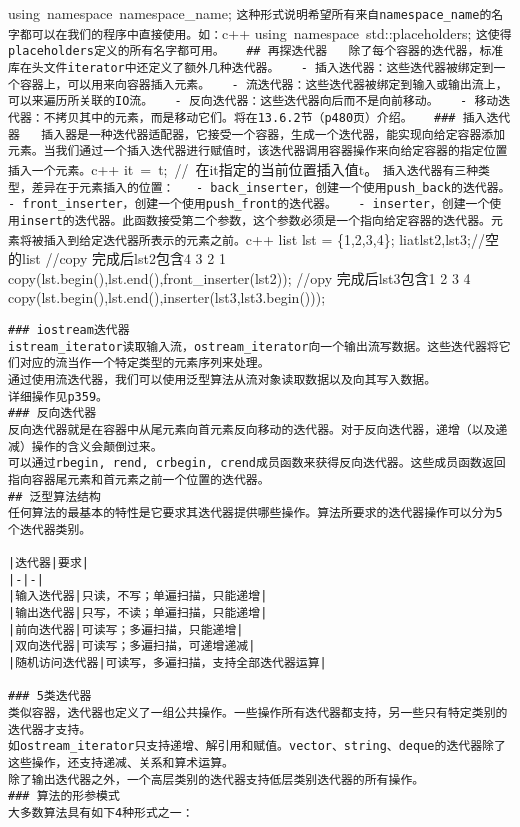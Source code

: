 \documentclass[
  a4paper,
  oneside,tablecaptionabove
]{scrbook}
\begin{document}
using~namespace~namespace\_name;
\lstinline!这种形式说明希望所有来自namespace_name的名字都可以在我们的程序中直接使用。如：!c++
using~namespace~std::placeholders;
\lstinline!这使得placeholders定义的所有名字都可用。   ## 再探迭代器   除了每个容器的迭代器，标准库在头文件iterator中还定义了额外几种迭代器。   - 插入迭代器：这些迭代器被绑定到一个容器上，可以用来向容器插入元素。   - 流迭代器：这些迭代器被绑定到输入或输出流上，可以来遍历所关联的IO流。   - 反向迭代器：这些迭代器向后而不是向前移动。   - 移动迭代器：不拷贝其中的元素，而是移动它们。将在13.6.2节（p480页）介绍。   ### 插入迭代器   插入器是一种迭代器适配器，它接受一个容器，生成一个迭代器，能实现向给定容器添加元素。当我们通过一个插入迭代器进行赋值时，该迭代器调用容器操作来向给定容器的指定位置插入一个元素。!c++
it~=~t;~//~在it指定的当前位置插入值t。
\lstinline!插入迭代器有三种类型，差异在于元素插入的位置：   - back_inserter，创建一个使用push_back的迭代器。   - front_inserter，创建一个使用push_front的迭代器。   - inserter，创建一个使用insert的迭代器。此函数接受第二个参数，这个参数必须是一个指向给定容器的迭代器。元素将被插入到给定迭代器所表示的元素之前。!c++
list lst = \{1,2,3,4\}; liatlst2,lst3;//空的list //copy 完成后lst2包含4
3 2 1 copy(lst.begin(),lst.end(),front\_inserter(lst2)); //opy
完成后lst3包含1 2 3 4
copy(lst.begin(),lst.end(),inserter(lst3,lst3.begin()));

\begin{lstlisting}
### iostream迭代器  
istream_iterator读取输入流，ostream_iterator向一个输出流写数据。这些迭代器将它们对应的流当作一个特定类型的元素序列来处理。  
通过使用流迭代器，我们可以使用泛型算法从流对象读取数据以及向其写入数据。  
详细操作见p359。  
### 反向迭代器  
反向迭代器就是在容器中从尾元素向首元素反向移动的迭代器。对于反向迭代器，递增（以及递减）操作的含义会颠倒过来。  
可以通过rbegin, rend, crbegin, crend成员函数来获得反向迭代器。这些成员函数返回指向容器尾元素和首元素之前一个位置的迭代器。  
## 泛型算法结构  
任何算法的最基本的特性是它要求其迭代器提供哪些操作。算法所要求的迭代器操作可以分为5个迭代器类别。  

|迭代器|要求|
|-|-|
|输入迭代器|只读，不写；单遍扫描，只能递增|
|输出迭代器|只写，不读；单遍扫描，只能递增|
|前向迭代器|可读写；多遍扫描，只能递增|
|双向迭代器|可读写；多遍扫描，可递增递减|
|随机访问迭代器|可读写，多遍扫描，支持全部迭代器运算|

### 5类迭代器  
类似容器，迭代器也定义了一组公共操作。一些操作所有迭代器都支持，另一些只有特定类别的迭代器才支持。  
如ostream_iterator只支持递增、解引用和赋值。vector、string、deque的迭代器除了这些操作，还支持递减、关系和算术运算。  
除了输出迭代器之外，一个高层类别的迭代器支持低层类别迭代器的所有操作。  
### 算法的形参模式
大多数算法具有如下4种形式之一：  
\end{lstlisting}
\end{document}
